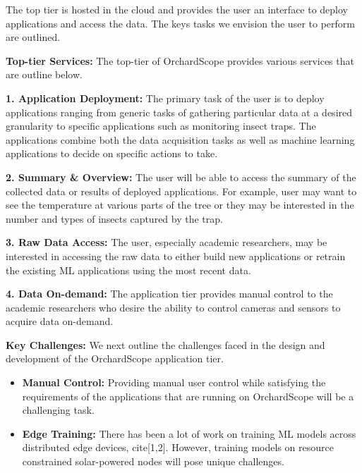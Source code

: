 The top tier is hosted in the cloud and provides the user an interface to deploy applications and access the data. The keys tasks we envision the user to perform are outlined. 

\noindent
\textbf{Top-tier Services: } The top-tier of OrchardScope provides various services that are outline below. 

\noindent
\textbf{1. Application Deployment:} The primary task of the user is to deploy applications ranging from generic tasks of gathering particular data at a desired granularity to specific applications such as monitoring insect traps. The applications combine both the data acquisition tasks as well as machine learning applications to decide on specific actions to take. 

\noindent
\textbf{2. Summary \& Overview:} The user will be able to access the summary of the collected data or results of deployed applications. For example, user may want to see the temperature at various parts of the tree or they may be interested in the number and types of insects captured by the trap. 

\noindent
\textbf{3. Raw Data Access:} The user, especially academic researchers, may be interested in accessing the raw data to either build new applications or retrain the existing ML applications using the most recent data. 

\noindent
\textbf{4. Data On-demand:} The application tier provides manual control to the academic researchers who desire the ability to control cameras and sensors to acquire data on-demand. 

\noindent
\textbf{Key Challenges:} We next outline the challenges faced in the design and development of the OrchardScope application tier. 
\begin{itemize}
    \item \textbf{Manual Control:} Providing manual user control while satisfying the requirements of the applications that are running on OrchardScope will be a challenging task. 
    \item \textbf{Edge Training:} There has been a lot of work on training ML models across distributed edge devices, cite[1,2]. However, training models on resource constrained solar-powered nodes will pose unique challenges. 
\end{itemize}



